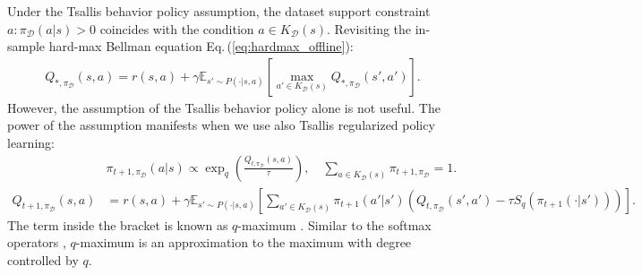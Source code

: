 \documentclass{article}
\newcommand{\AdaBracket}[1]{\left(#1\right)}
\newcommand{\AdaRectBracket}[1]{\left[#1\right]}
\newcommand{\expectation}[2]{\mathbb{E}_{#1}\AdaRectBracket{#2}}
\newcommand{\eq}[1]{Eq.\,(#1)}
\newcommand{\datasetOptimalQ}{Q_{*, \pi_{\mathcal{D}}}}
\newcommand{\datasetPolicy}{\pi_{\mathcal{D}}}
\begin{document}
Under the Tsallis behavior policy assumption, the dataset support constraint $a: \datasetPolicy(a|s) > 0$ coincides with the condition $a \in K_{\mathcal{D}}(s)$.
Revisiting the in-sample hard-max Bellman equation \eq{\ref{eq:hardmax_offline}}:
\begin{align*}
    \datasetOptimalQ(s,a) = r(s,a) + \gamma \expectation{s'\sim P(\cdot | s,a)}{\max_{a'\in K_{\mathcal{D}}(s)} \datasetOptimalQ(s',a')}.
\end{align*}
However, the assumption of the Tsallis behavior policy alone is not useful.
The power of the assumption manifests when we use also Tsallis regularized policy learning:
\begin{align}
    & \pi_{t+1, \datasetPolicy}(a|s) \propto \exp_q\AdaBracket{\frac{Q_{t, \datasetPolicy}(s,a)}{\tau}},  \quad \sum_{a\in K_{\mathcal{D}}(s)} \pi_{t+1, \datasetPolicy} = 1.\\
    Q_{t+1, \datasetPolicy}(s,a) &= r(s,a) +  \gamma \expectation{s'\sim P(\cdot | s,a)}{ \sum_{a' \in K_{\mathcal{D}}(s)} \!\!\!\!\! \pi_{t+1}(a'|s') \AdaBracket{Q_{t, \datasetPolicy}(s',a') - \tau S_q(\pi_{t+1}(\cdot|s'))}}.
    \label{eq:proposal_policy}
\end{align}
The term inside the bracket is known as $q$-maximum \cite{Lee2020-generalTsallisRSS}.
Similar to the softmax operators \cite{asadi17a,azar2012dynamic}, $q$-maximum is an approximation to the maximum with degree controlled by $q$.
\end{document}
